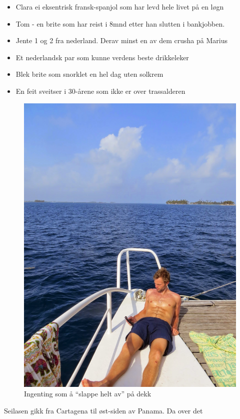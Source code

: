 \begin{itemize}
	\item Clara ei eksentrisk fransk-spanjol som har levd hele
		livet på en løgn
	\item Tom - en brite som har reist i 8mnd etter han slutten i
		bankjobben.
	\item Jente 1 og 2 fra nederland. Derav minst en av dem crusha på Marius
	\item Et nederlandsk par som kunne verdens beste drikkeleker
	\item Blek brite som snorklet en hel dag uten solkrem
	\item En feit sveitser i 30-årene som ikke er over
		trassalderen
\end{itemize}
\begin{figure}[H]
	\centering
	\includegraphics[width=\textwidth]{flex}
	\caption*{Ingenting som å ``slappe helt av'' på dekk}
	\label{fig:tintin}
\end{figure}
Seilasen gikk fra Cartagena til øst-siden av Panama. Da over det
